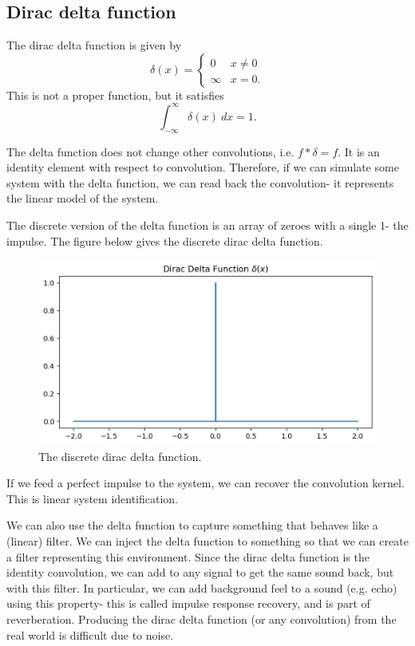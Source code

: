 \documentclass[a4paper, openany]{memoir}
\begin{document}
\subsection{Dirac delta function}
The dirac delta function is given by
\[\delta(x) = \begin{cases}
    0 & x \neq 0 \\
    \infty & x = 0.
\end{cases}\]
This is not a proper function, but it satisfies
\[\int_{-\infty}^{\infty} \delta(x) \ dx = 1.\]

The delta function does not change other convolutions, i.e. $f * \delta = f$. It is an identity element with respect to convolution. Therefore, if we can simulate some system with the delta function, we can read back the convolution- it represents the linear model of the system.

The discrete version of the delta function is an array of zeroes with a single 1- the impulse. The figure below gives the discrete dirac delta function.
\begin{figure}[H]
    \centering
    \includegraphics[scale=0.5]{src/6.20 dirac delta.png}
    \caption{The discrete dirac delta function.}
\end{figure}
\noindent If we feed a perfect impulse to the system, we can recover the convolution kernel. This is linear system identification.

We can also use the delta function to capture something that behaves like a (linear) filter. We can inject the delta function to something so that we can create a filter representing this environment. Since the dirac delta function is the identity convolution, we can add to any signal to get the same sound back, but with this filter. In particular, we can add background feel to a sound (e.g. echo) using this property- this is called impulse response recovery, and is part of reverberation. Producing the dirac delta function (or any convolution) from the real world is difficult due to noise.
\end{document}
